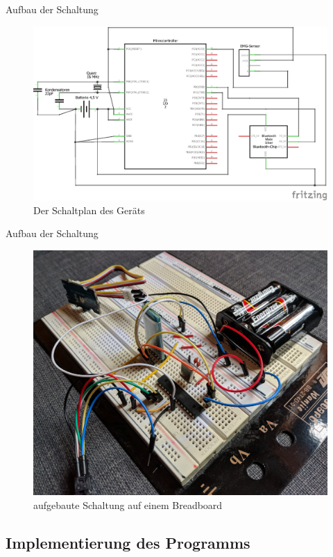 \documentclass[hyphens]{beamer}
\begin{document}
\begin{frame}{Aufbau der Schaltung}
\begin{figure}
	\includegraphics[scale=0.7]{pics/mikrocontroller-schaltplan}
	\caption{Der Schaltplan des Geräts}
\end{figure}
\end{frame}

  \begin{frame}{Aufbau der Schaltung}
\begin{figure}
	\includegraphics[scale=0.06]{pics/mikro}
	\caption{aufgebaute Schaltung auf einem Breadboard}
\end{figure}
\end{frame}

\subsection{Implementierung des Programms}
\end{document}
